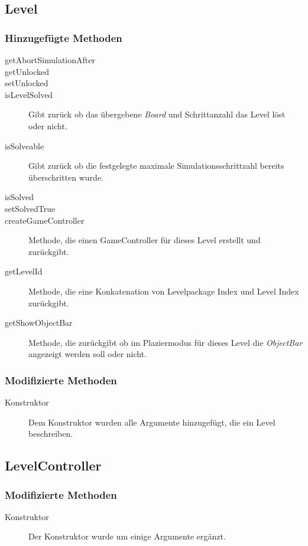 \subsection{Level}

	\subsubsection{Hinzugefügte Methoden}
		\begin{description}
			\item[getAbortSimulationAfter]
			\item[getUnlocked]
			\item[setUnlocked]
			\item[isLevelSolved] Gibt zurück ob das übergebene \emph{Board} und Schrittanzahl 
				das Level löst oder nicht.
			\item[isSolveable] Gibt zurück ob die festgelegte maximale Simulationsschrittzahl bereits 
				überschritten wurde.
			\item[isSolved]
			\item[setSolvedTrue]
			\item[createGameController] Methode, die einen GameController für dieses Level erstellt und zurückgibt.
			\item[getLevelId] Methode, die eine Konkatenation von Levelpackage Index und Level Index zurückgibt.
			\item[getShowObjectBar] Methode, die zurückgibt ob im Plaziermodus für dieses Level die \emph{ObjectBar} 
				angezeigt werden soll oder nicht.
		\end{description}
	\subsubsection{Modifizierte Methoden}
		\begin{description}
			\item[Konstruktor] Dem Konstruktor wurden alle Argumente hinzugefügt, die ein Level beschreiben.
		\end{description}

\subsection{LevelController}

	\subsubsection{Modifizierte Methoden}
		\begin{description}
			\item[Konstruktor] Der Konstruktor wurde um einige Argumente ergänzt.
		\end{description}
